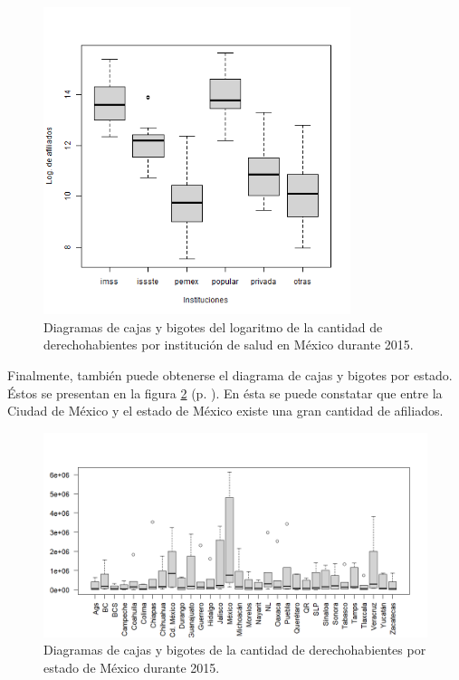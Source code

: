 \documentclass[paper=leter, fontsize=11pt]{scrartcl}
\numberwithin{equation}{section}		%
\numberwithin{figure}{section}			%
\numberwithin{table}{section}				%
\begin{document}
\begin{figure}
    \centering
    \includegraphics[width=0.8\textwidth]{inst_log.png}
    \caption{Diagramas de cajas y bigotes del logaritmo de la cantidad de derechohabientes por institución de salud en México durante 2015.}
    \label{inst_log}
\end{figure}

Finalmente, también puede obtenerse el diagrama de cajas y bigotes por estado. Éstos se presentan en la figura \ref{estados} (p. \pageref{estados}). En ésta se puede constatar que entre la Ciudad de México y el estado de México existe una gran cantidad de afiliados.

\begin{figure}
    \centering
    \includegraphics[width=1\textwidth]{estados.png}
    \caption{Diagramas de cajas y bigotes de la cantidad de derechohabientes por estado de México durante 2015.}
    \label{estados}
\end{figure}



\end{document}
